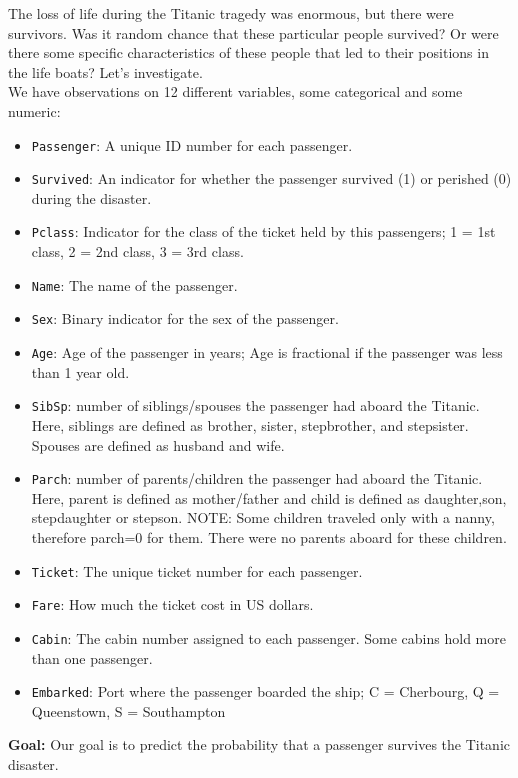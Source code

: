 \documentclass[11pt]{article}
\begin{document}
\noindent The loss of life during the Titanic tragedy was enormous, but there were survivors. Was it random chance that these particular people survived? Or were there some specific characteristics of these people that led to their positions in the life boats? Let's investigate.\\

\noindent We have observations on 12 different variables, some categorical and some numeric:

\begin{itemize}
\item \verb;Passenger;: A unique ID number for each passenger.
\item \verb;Survived;: An indicator for whether the passenger survived (1) or perished (0) during the disaster.
\item \verb;Pclass;: Indicator for the class of the ticket held by this passengers; 1 = 1st class, 2 = 2nd class, 3 = 3rd class.
\item \verb;Name;: The name of the passenger.
\item \verb;Sex;: Binary indicator for the sex of the passenger.
\item \verb;Age;: Age of the passenger in years; Age is fractional if the passenger was less than 1 year old.
\item \verb;SibSp;: number of siblings/spouses the passenger had aboard the Titanic. Here, siblings are defined as brother, sister, stepbrother, and stepsister. Spouses are defined as husband and wife.
\item \verb;Parch;: number of parents/children the passenger had aboard the Titanic. Here, parent is defined as mother/father and child is defined as daughter,son, stepdaughter or stepson. NOTE: Some children traveled only with a nanny, therefore parch=0 for them. There were no parents aboard for these children.
\item \verb;Ticket;: The unique ticket number for each passenger.
\item \verb;Fare;: How much the ticket cost in US dollars.
\item \verb;Cabin;: The cabin number assigned to each passenger. Some cabins hold more than one passenger.
\item \verb;Embarked;: Port where the passenger boarded the ship; C = Cherbourg, Q = Queenstown, S = Southampton
\end{itemize}

\noindent \textbf{Goal:} Our goal is to predict the probability that a passenger survives the Titanic disaster.
\end{document}
